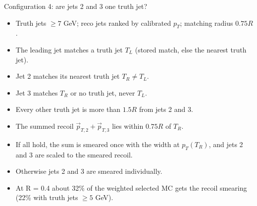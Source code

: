 \documentclass[aspectratio=169,10pt]{beamer}
\begin{document}
\begin{frame}{Configuration 4: are jets 2 and 3 one truth jet?}
  \begin{itemize}
    \item Truth jets $\geq 7$ GeV; reco jets ranked by calibrated $p_T$; matching radius $0.75R$.
    \item The leading jet matches a truth jet $T_L$ (stored match, else the nearest truth jet).
    \item Jet 2 matches its nearest truth jet $T_R \neq T_L$.
    \item Jet 3 matches $T_R$ or no truth jet, never $T_L$.
    \item Every other truth jet is more than $1.5R$ from jets 2 and 3.
    \item The summed recoil $\vec p_{T,2} + \vec p_{T,3}$ lies within $0.75R$ of $T_R$.
  \end{itemize}
  \vspace{0.5em}
  \begin{itemize}
    \item If all hold, the sum is smeared once with the width at $p_T(T_R)$, and jets 2 and 3 are scaled to the smeared recoil.
    \item Otherwise jets 2 and 3 are smeared individually.
    \item At R = 0.4 about 32\% of the weighted selected MC gets the recoil smearing (22\% with truth jets $\geq 5$ GeV).
  \end{itemize}
\end{frame}
\end{document}
